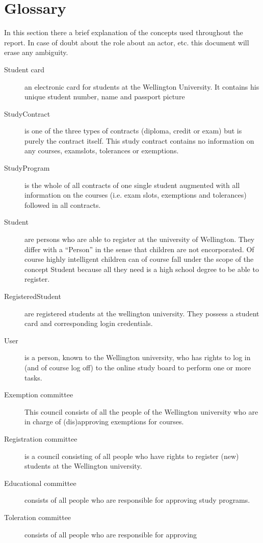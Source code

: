 \chapter{Glossary}
\label{glossary}

\npar In this section there a brief explanation of the concepts used throughout
the report. In case of doubt about the role about an actor, etc. this document
will erase any ambiguity.

\begin{description}
\item[Student card] an electronic card for students at the Wellington
University.
It contains his unique student number, name and passport picture
\item[StudyContract] is one of the three types of contracts (diploma, credit or
exam) but is purely the contract itself. This study contract contains no
information on any courses, examslots, tolerances or exemptions.
\item[StudyProgram] is the whole of all contracts of one single student
augmented with all information on the courses (i.e. exam slots, exemptions and
tolerances) followed in all contracts.
\item[Student] are persons who are able to register at the university of
Wellington. They differ with a ``Person'' in the sense that children are
not encorporated. Of course highly intelligent children can of course fall under
the scope of the concept Student because all they need is a high school degree
to be able to register.
\item[RegisteredStudent] are registered students at the wellington university.
They possess a student card and corresponding login credentials.
\item[User] is a person, known to the Wellington university, who has rights to
log in (and of course log off) to the online study board to perform one or more
tasks.
\item[Exemption committee] This council consists of all the people of the
Wellington university who are in charge of (dis)approving exemptions for
courses.
\item[Registration committee] is a council consisting of all people who have
rights to register (new) students at the Wellington university.
\item[Educational committee] consists of all people who are responsible for
approving study programs.
\item[Toleration committee] consists of all people who are responsible for approving

\end{description}
